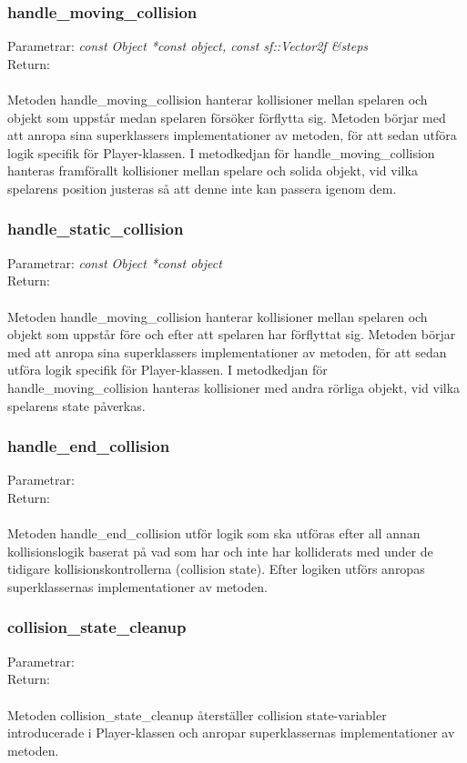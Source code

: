 \documentclass{TDP003mall}
\begin{document}
 \subsubsection{handle\_moving\_collision}
Parametrar: \textit{const Object *const object, const sf::Vector2f \&steps}
\\Return: \textit{}
\\\\
Metoden handle\_moving\_collision hanterar kollisioner mellan spelaren och objekt som uppstår medan spelaren försöker förflytta sig. Metoden börjar med att anropa sina superklassers implementationer av metoden, för att sedan utföra logik specifik för Player-klassen. I metodkedjan för handle\_moving\_collision hanteras framförallt kollisioner mellan spelare och solida objekt, vid vilka spelarens position justeras så att denne inte kan passera igenom dem.

 \subsubsection{handle\_static\_collision}
Parametrar: \textit{const Object *const object}
\\Return: \textit{}
\\\\
Metoden handle\_moving\_collision hanterar kollisioner mellan spelaren och objekt som uppstår före och efter att spelaren har förflyttat sig. Metoden börjar med att anropa sina superklassers implementationer av metoden, för att sedan utföra logik specifik för Player-klassen. I metodkedjan för handle\_moving\_collision hanteras kollisioner med andra rörliga objekt, vid vilka spelarens state påverkas.

 \subsubsection{handle\_end\_collision}
Parametrar: \textit{}
\\Return: \textit{}
\\\\
Metoden handle\_end\_collision utför logik som ska utföras efter all annan kollisionslogik baserat på vad som har och inte har kolliderats med under de tidigare kollisionskontrollerna (collision state). Efter logiken utförs anropas superklassernas implementationer av metoden.

 \subsubsection{collision\_state\_cleanup}
Parametrar: \textit{}
\\Return: \textit{}
\\\\
Metoden collision\_state\_cleanup återställer collision state-variabler introducerade i Player-klassen och anropar superklassernas implementationer av metoden.
\end{document}
